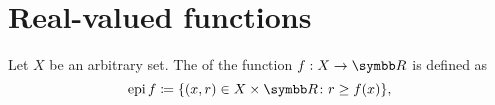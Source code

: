 \section{Real-valued functions}\label{sec:real_valued_functions}

\begin{definition}\label{def:epigraph}
  Let \( X \) be an arbitrary set. The  of the function \( f: X \to \BR \) is defined as
  \begin{equation*}
    \Epi f \coloneqq \{ (x, r) \in X \times \BR \colon r \geq f(x) \},
  \end{equation*}
\end{definition}
